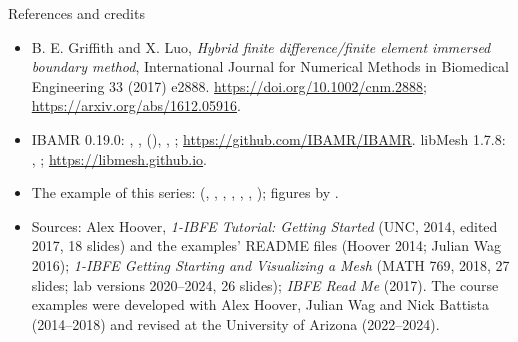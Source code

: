 \documentclass[aspectratio=169,11pt]{beamer}
\begin{document}
\begin{frame}{References and credits}
\label{fr:refs}
\scriptsize
\begin{itemize}
  \item B. E. Griffith and X. Luo, \emph{Hybrid finite difference/finite element immersed boundary method}, International Journal for Numerical Methods in Biomedical Engineering 33 (2017) e2888. \url{https://doi.org/10.1002/cnm.2888}; \url{https://arxiv.org/abs/1612.05916}.
  \item IBAMR 0.19.0: , ,  (), , ; \url{https://github.com/IBAMR/IBAMR}. libMesh 1.7.8: , ; \url{https://libmesh.github.io}.
  \item The example of this series:  (, , , , , , ); figures by .
  \item Sources: Alex Hoover, \emph{1-IBFE Tutorial: Getting Started} (UNC, 2014, edited 2017, 18 slides) and the examples' README files (Hoover 2014; Julian Wag 2016); \emph{1-IBFE Getting Starting and Visualizing a Mesh} (MATH 769, 2018, 27 slides; lab versions 2020--2024, 26 slides); \emph{IBFE Read Me} (2017). The course examples were developed with Alex Hoover, Julian Wag and Nick Battista (2014--2018) and revised at the University of Arizona (2022--2024).
\end{itemize}
\end{frame}
\end{document}
